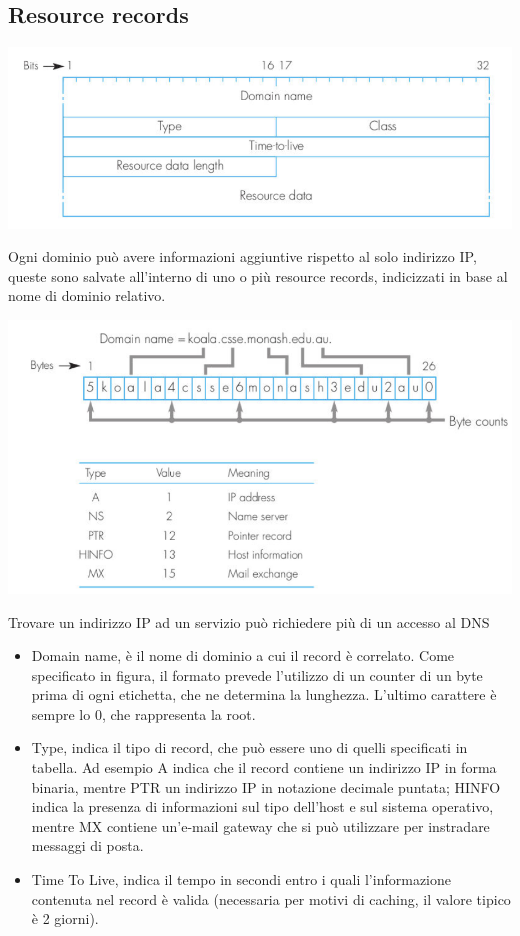\documentclass[11pt, oneside]{article}   	%
\begin{document}
\subsection*{Resource records}
\begin{center}
\includegraphics[scale=0.5]{73}
\end{center}
Ogni dominio può avere informazioni aggiuntive rispetto al solo indirizzo IP, queste sono salvate all'interno di uno o più resource records, indicizzati in base al nome di dominio relativo.
\begin{center}
\includegraphics[scale=0.5]{74}
\end{center}
Trovare un indirizzo IP ad un servizio può richiedere più di un accesso al DNS
\begin{itemize}
\item Domain name, è il nome di dominio a cui il record è correlato. Come specificato in figura, il formato prevede l’utilizzo di un counter di un byte prima di ogni etichetta, che ne determina la lunghezza. L’ultimo carattere è sempre lo 0, che rappresenta la root.
\item Type, indica il tipo di record, che può essere uno di quelli specificati in tabella. Ad esempio A indica che il record contiene un indirizzo IP in forma binaria, mentre PTR un indirizzo IP in notazione decimale puntata; HINFO indica la presenza di informazioni sul tipo dell’host e
sul sistema operativo, mentre MX contiene un’e-mail gateway che si può utilizzare per instradare messaggi di posta.
\item Time To Live, indica il tempo in secondi entro i quali l’informazione contenuta nel record è valida (necessaria per motivi di caching, il valore tipico è 2 giorni).
\end{itemize}
\end{document}
